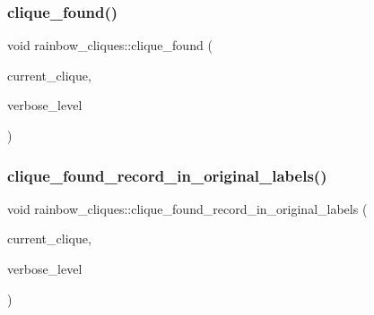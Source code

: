\subsubsection{\texorpdfstring{clique\+\_\+found()}{clique\_found()}}
{\footnotesize\ttfamily void rainbow\+\_\+cliques\+::clique\+\_\+found (\begin{DoxyParamCaption}\item[{\mbox{\hyperlink{galois_8h_a09fddde158a3a20bd2dcadb609de11dc}{I\+NT}} $\ast$}]{current\+\_\+clique,  }\item[{\mbox{\hyperlink{galois_8h_a09fddde158a3a20bd2dcadb609de11dc}{I\+NT}}}]{verbose\+\_\+level }\end{DoxyParamCaption})}

\mbox{\label{classrainbow__cliques_a7234e4e8830961bfa4834bb31f0d102e}} 
\subsubsection{\texorpdfstring{clique\+\_\+found\+\_\+record\+\_\+in\+\_\+original\+\_\+labels()}{clique\_found\_record\_in\_original\_labels()}}
{\footnotesize\ttfamily void rainbow\+\_\+cliques\+::clique\+\_\+found\+\_\+record\+\_\+in\+\_\+original\+\_\+labels (\begin{DoxyParamCaption}\item[{\mbox{\hyperlink{galois_8h_a09fddde158a3a20bd2dcadb609de11dc}{I\+NT}} $\ast$}]{current\+\_\+clique,  }\item[{\mbox{\hyperlink{galois_8h_a09fddde158a3a20bd2dcadb609de11dc}{I\+NT}}}]{verbose\+\_\+level }\end{DoxyParamCaption})}

\mbox{\label{classrainbow__cliques_a9c88c580e819f9de09006f473575a642}} 
